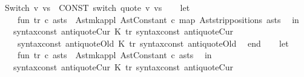 \begin{isabellebody}
\ {\isachardoublequoteopen}{\isacharparenleft}{\isacharunderscore}Switch\ v\ vs{\isacharparenright}{\isachardoublequoteclose}\ {\isacharequal}{\isachargreater}\ {\isachardoublequoteopen}CONST\ switch\ {\isacharparenleft}{\isacharunderscore}quote\ v{\isacharparenright}\ vs{\isachardoublequoteclose}\isanewline
%
\isadelimML
\isanewline
%
\endisadelimML
%
\isatagML
{}\isamarkupfalse%
\ {\isacartoucheopen}\isanewline
\ \ let\isanewline
\ \ \ \ fun\ tr\ c\ asts\ {\isacharequal}\ Ast{\isachardot}mk{\isacharunderscore}appl\ {\isacharparenleft}Ast{\isachardot}Constant\ c{\isacharparenright}\ {\isacharparenleft}map\ Ast{\isachardot}strip{\isacharunderscore}positions\ asts{\isacharparenright}\isanewline
\ \ in\isanewline
\ \ \ {\isacharbrackleft}{\isacharparenleft}{\isacharat}{\isacharbraceleft}syntax{\isacharunderscore}const\ {\isachardoublequote}{\isacharunderscore}antiquoteCur{}{\isachardoublequote}{\isacharbraceright}{\isacharcomma}\ K\ {\isacharparenleft}tr\ {\isacharat}{\isacharbraceleft}syntax{\isacharunderscore}const\ {\isachardoublequote}{\isacharunderscore}antiquoteCur{\isachardoublequote}{\isacharbraceright}{\isacharparenright}{\isacharparenright}{\isacharcomma}\isanewline
\ \ \ \ {\isacharparenleft}{\isacharat}{\isacharbraceleft}syntax{\isacharunderscore}const\ {\isachardoublequote}{\isacharunderscore}antiquoteOld{}{\isachardoublequote}{\isacharbraceright}{\isacharcomma}\ K\ {\isacharparenleft}tr\ {\isacharat}{\isacharbraceleft}syntax{\isacharunderscore}const\ {\isachardoublequote}{\isacharunderscore}antiquoteOld{\isachardoublequote}{\isacharbraceright}{\isacharparenright}{\isacharparenright}{\isacharbrackright}\isanewline
\ \ end\isanewline
{\isacartoucheclose}\isanewline
\isanewline
{}\isamarkupfalse%
\ {\isacartoucheopen}\isanewline
\ \ let\isanewline
\ \ \ \ fun\ tr\ c\ asts\ {\isacharequal}\ Ast{\isachardot}mk{\isacharunderscore}appl\ {\isacharparenleft}Ast{\isachardot}Constant\ c{\isacharparenright}\ asts\isanewline
\ \ in\isanewline
\ \ \ {\isacharbrackleft}{\isacharparenleft}{\isacharat}{\isacharbraceleft}syntax{\isacharunderscore}const\ {\isachardoublequote}{\isacharunderscore}antiquoteCur{\isachardoublequote}{\isacharbraceright}{\isacharcomma}\ K\ {\isacharparenleft}tr\ {\isacharat}{\isacharbraceleft}syntax{\isacharunderscore}const\ {\isachardoublequote}{\isacharunderscore}antiquoteCur{}{\isachardoublequote}{\isacharbraceright}{\isacharparenright}{\isacharparenright}{\isacharcomma}\isanewline

\end{isabellebody}
